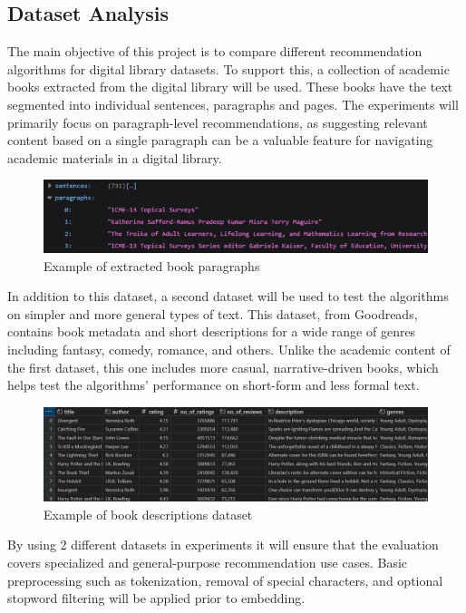 \documentclass[\myFontSize,a4paper,oneside,hidelinks]{article}
\begin{document}
\subsection{Dataset Analysis}
The main objective of this project is to compare different recommendation algorithms for digital library datasets. To support this, a collection of academic books extracted from the digital library will be used. 
These books have the text segmented into individual sentences, paragraphs and pages. The experiments will primarily focus on paragraph-level recommendations, as suggesting relevant content based on a single paragraph can be a valuable feature for navigating academic materials in a digital library.
%
\begin{figure}[H]
    \centering
    \includegraphics[width=1\textwidth]{img/json_example2.png}
    \caption{Example of extracted book paragraphs}
    \label{fig:extracted_paragraph_example}
\end{figure}
%
In addition to this dataset, a second dataset will be used to test the algorithms on simpler and more general types of text. This dataset, from Goodreads, contains book metadata and short descriptions for a wide range of genres including fantasy, comedy, romance, and others. Unlike the academic content of the first dataset, this one includes more casual, narrative-driven books, which helps test the algorithms’ performance on short-form and less formal text.
%
\begin{figure}[H]
    \centering
    \includegraphics[width=1\textwidth]{img/rating_data_example2.png}
    \caption{Example of book descriptions dataset \cite{goodreads_kumar_2022}}
    \label{fig:book_description_dataset_example}
\end{figure}
%
By using 2 different datasets in experiments it will ensure that the evaluation covers specialized and general-purpose recommendation use cases. Basic preprocessing such as tokenization, removal of special characters, and optional stopword filtering will be applied prior to embedding.
%
%
%
\end{document}
